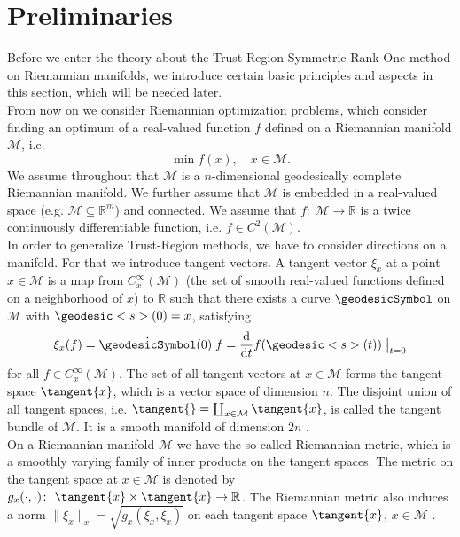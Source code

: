 \section{Preliminaries}

Before we enter the theory about the Trust-Region Symmetric Rank-One method on Riemannian manifolds, we introduce certain basic principles and aspects in this section, which will be needed later. \\

From now on we consider Riemannian optimization problems, which consider finding an optimum of a real-valued function $f$ defined on a Riemannian manifold $\mathcal{M}$, i.e.
\begin{equation*}
    \min f(x), \quad x \in \mathcal{M}.
\end{equation*}
We assume throughout that $\mathcal{M}$ is a $n$-dimensional geodesically complete Riemannian manifold. We further assume that $\mathcal{M}$ is embedded in a real-valued space (e.g. $\mathcal{M} \subseteq \mathbb{R}^m$) and connected. We assume that $f \colon \ \mathcal{M} \to \mathbb{R}$ is a twice continuously differentiable function, i.e. $f \in C^2(\mathcal{M})$. \\
In order to generalize Trust-Region methods, we have to consider directions on a manifold. For that we introduce tangent vectors. A tangent vector $\xi_x$ at a point $x \in \mathcal{M}$ is a map from $C^{\infty}_x(\mathcal{M})$ (the set of smooth real-valued functions defined on a neighborhood of $x$) to $\mathbb{R}$ such that there exists a curve $\geodesicSymbol$ on $\mathcal{M}$ with $\geodesic<s>(0) = x$, satisfying
\begin{equation*}
    \xi_x (f) = \dot{\geodesicSymbol}(0) \; f = \frac{\mathrm{d}}{\mathrm{d}t} f(\geodesic<s>(t)) \; \big{\vert}_{t=0}
\end{equation*}
for all $f \in C^{\infty}_x(\mathcal{M})$. The set of all tangent vectors at $x \in \mathcal{M}$ forms the tangent space $\tangent{x}$, which is a vector space of dimension $n$. The disjoint union of all tangent spaces, i.e. $\tangent{} = \coprod_{x \in \mathcal{M}} \tangent{x}$, is called the tangent bundle of $\mathcal{M}$. It is a smooth manifold of dimension $2n$ \cite[p.~33-36]{AbsilMahonySepulchre:2008}. \\
On a Riemannian manifold $\mathcal{M}$ we have the so-called Riemannian metric, which is a smoothly varying family of inner products on the tangent spaces. The metric on the tangent space at $x \in \mathcal{M}$ is denoted by $g_x(\cdot, \cdot) \colon \ \tangent{x} \times \tangent{x} \to \mathbb{R}$. The Riemannian metric also induces a norm $\lVert \xi_x \rVert_x = \sqrt{g_x(\xi_x, \xi_x)}$ on each tangent space $\tangent{x}$, $x \in \mathcal{M}$ \cite[p.~45]{AbsilMahonySepulchre:2008}. \\
